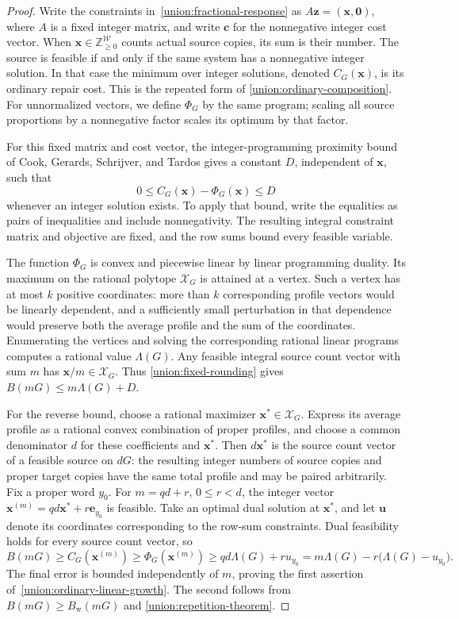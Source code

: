 \documentclass[10pt,a4paper]{amsart}
\numberwithin{equation}{section}
\theoremstyle{definition}
\theoremstyle{remark}
\begin{document}
\begin{proof}
Write the constraints in~\eqref{union:fractional-response} as
$A\mathbf z=(\mathbf x,\mathbf0)$, where $A$ is a fixed integer
matrix, and write $\mathbf c$ for the nonnegative integer cost vector.
When $\mathbf x\in\mathbb Z_{\ge0}^{\mathcal W}$ counts actual
source copies, its sum is their number. The source is feasible if
and only if the same system has a nonnegative integer solution.
In that case the minimum over integer solutions, denoted
$C_G(\mathbf x)$, is its ordinary repair cost. This is the repeated
form of \cref{union:ordinary-composition}. For unnormalized vectors,
we define $\Phi_G$ by the same program; scaling all source proportions
by a nonnegative factor scales its optimum by that factor.

For this fixed matrix and cost vector, the integer-programming
proximity bound of Cook, Gerards, Schrijver, and Tardos
\cite[Corollary~2]{cook1986} gives a constant $D$, independent of
$\mathbf x$, such that
\begin{equation}\label{union:fixed-rounding}
 0\le C_G(\mathbf x)-\Phi_G(\mathbf x)\le D
\end{equation}
whenever an integer solution exists. To apply that bound, write the
equalities as pairs of inequalities and include nonnegativity.
The resulting integral constraint matrix and objective are fixed,
and the row sums bound every feasible variable.

The function $\Phi_G$ is convex and piecewise linear by linear
programming duality. Its maximum on the rational polytope
$\mathcal X_G$ is attained at a vertex. Such a vertex has at most
$k$ positive coordinates: more than $k$ corresponding profile vectors
would be linearly dependent, and a sufficiently small perturbation
in that dependence would preserve both the average profile and the
sum of the coordinates. Enumerating the vertices and solving the
corresponding rational linear programs computes a rational value
$\Lambda(G)$. Any feasible integral source count vector with sum
$m$ has $\mathbf x/m\in\mathcal X_G$. Thus
\eqref{union:fixed-rounding} gives
$B(mG)\le m\Lambda(G)+D$.

For the reverse bound, choose a rational maximizer
$\mathbf x^*\in\mathcal X_G$. Express its average profile as a
rational convex combination of proper profiles, and choose a common
denominator $d$ for these coefficients and $\mathbf x^*$.
Then $d\mathbf x^*$ is the source count vector of a feasible source
on $dG$: the resulting integer numbers of source copies and proper
target copies have the same total profile and may be paired
arbitrarily. Fix a proper word $y_0$. For $m=qd+r$, $0\le r<d$, the
integer vector
$\mathbf x^{(m)}=qd\mathbf x^*+r\mathbf e_{y_0}$ is feasible.
Take an optimal dual solution at $\mathbf x^*$, and let
$\mathbf u$ denote its coordinates corresponding to the row-sum
constraints. Dual feasibility holds for every source count vector,
so
\[
 B(mG)\ge C_G(\mathbf x^{(m)})
 \ge\Phi_G(\mathbf x^{(m)})
 \ge qd\Lambda(G)+ru_{y_0}
 =m\Lambda(G)-r\bigl(\Lambda(G)-u_{y_0}\bigr).
\]
The final error is bounded independently of $m$, proving the first
assertion of~\eqref{union:ordinary-linear-growth}. The second follows
from $B(mG)\ge B_{\mathrm w}(mG)$ and
\cref{union:repetition-theorem}.


\end{proof}
\end{document}
